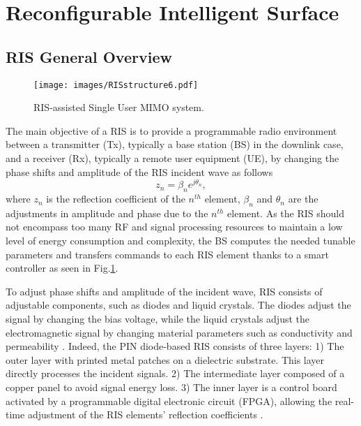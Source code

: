 \documentclass[conference]{IEEEtran}
\begin{document}
 \section{Reconfigurable Intelligent Surface}
 \label{sec:RIS}
 \subsection{RIS General Overview}
 \begin{figure}
\vspace{-0.4cm}
	\centering
\texttt{[image: images/RISstructure6.pdf]}
	\caption{ RIS-assisted Single User MIMO system. %
 }
        \vspace{-0.2cm}
	\label{fig:ris}
	\vspace{-0.2cm}
\end{figure}
The main objective of a RIS is to provide a programmable radio environment between a transmitter (Tx), typically a base station (BS) in the downlink case, and a receiver (Rx), typically a remote user equipment (UE),  by changing the phase shifts and amplitude of the RIS incident wave as follows \cite{liu2021reconfigurable}\begin{equation}\label{coef}
  z_n=\beta_ne^{j\theta_n}, 
  \end{equation}
where $z_n$ is the reflection coefficient of the $n^{th}$ element,  $\beta_n$ and $\theta_n$ are the adjustments in amplitude and phase due to the $n^{th}$ element.
As the RIS should not encompass too many RF and signal processing resources to maintain a low level of energy consumption and complexity, the BS computes the needed tunable parameters and transfers commands to each RIS element thanks to a smart controller \cite{9241881}  as seen in Fig.\ref{fig:ris}.


To adjust phase shifts and amplitude of the incident wave, RIS consists of adjustable components, such as diodes and liquid crystals. The diodes adjust the signal by changing the bias voltage, while the liquid crystals adjust the electromagnetic signal by changing material parameters such as conductivity and permeability \cite{9828501}. Indeed, the PIN diode-based RIS consists of three layers: 1) The outer layer with printed metal patches on a dielectric substrate. This layer directly processes the incident signals. 2) The intermediate layer
composed of a copper panel to avoid signal energy loss. 
3) The inner layer is a control board activated by a programmable digital electronic circuit  (FPGA), allowing the real-time adjustment of the  RIS elements' reflection coefficients \cite{9828501}.  
\end{document}

